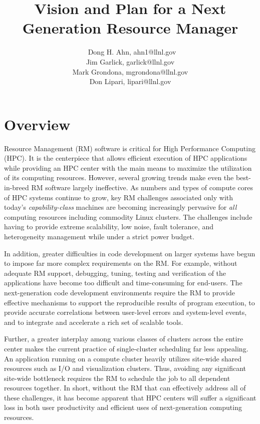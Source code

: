 \documentclass{article}
\newcommand{\ngrmfull}{Next Generation Resource Manager}
\begin{document}
\title{Vision and Plan for a \ngrmfull}
\author{\
Dong H. Ahn, ahn1@llnl.gov\\
Jim Garlick, garlick@llnl.gov\\
Mark Grondona, mgrondona@llnl.gov\\
Don Lipari, lipari@llnl.gov}


\maketitle

\section{Overview}
\label{sect:overview}
Resource Management (RM) software is critical for High Performance Computing
(HPC). It is the centerpiece that allows efficient execution of HPC applications
while providing an HPC center with the main means to maximize 
the utilization of its computing resources. However, several growing trends make
even the best-in-breed RM software largely ineffective. As numbers and
types of compute cores of HPC systems continue to grow, key RM challenges
associated only with today's {\em capability-class} machines are 
becoming increasingly pervasive for {\em all} computing resources including 
commodity Linux clusters. The challenges include having to provide 
extreme scalability, low noise, fault tolerance, and heterogeneity management
while under a strict power budget.

In addition, greater difficulties in code development on larger systems have
begun to impose far more complex requirements on the RM. For example,
without adequate RM support, debugging, tuning, testing and verification
of the applications have become too difficult and time-consuming for end-users.
The next-generation code development environments require the RM to provide
effective mechanisms to support the reproducible results of program execution, to
provide accurate correlations between user-level errors and system-level
events, and to integrate and accelerate a rich set of scalable tools.

Further, a greater interplay among various classes of clusters across
the entire center makes the current practice of single-cluster scheduling
far less appealing. An application running on a compute cluster heavily
utilizes site-wide shared resources such as I/O and visualization clusters.
Thus, avoiding any significant site-wide bottleneck requires the RM
to schedule the job to all dependent resources together. In short, without
the RM that can effectively address all of these challenges, it has become apparent
that HPC centers will suffer a significant loss in both user productivity
and efficient uses of next-generation computing resources.
\end{document}
